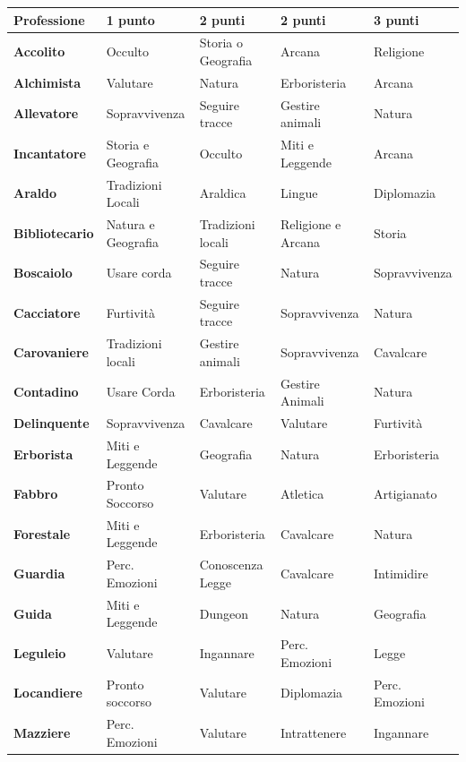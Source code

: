 	\noindent\begin{tabularx}{\linewidth}{X|l|l|l|l}
	\toprule
\rowcolor{gray!20}\textbf{Professione}& \textbf{1 punto} & \textbf{2 punti} & \textbf{2 punti} & \textbf{3 punti}\\
\toprule
\textbf{Accolito}& Occulto& Storia o Geografia& Arcana& Religione\\
\rowcolor{gray!20}\textbf{Alchimista}& Valutare&Natura& Erboristeria& Arcana\\
\textbf{Allevatore}& Sopravvivenza&Seguire tracce& Gestire animali&Natura \\
\rowcolor{gray!20}\textbf{Incantatore}& Storia e Geografia&Occulto&Miti e Leggende&Arcana\\
\textbf{Araldo} & Tradizioni Locali & Araldica & Lingue & Diplomazia \\
\rowcolor{gray!20}\textbf{Bibliotecario}& Natura e Geografia&Tradizioni locali&Religione e Arcana&Storia\\
\textbf{Boscaiolo}& Usare corda&Seguire tracce & Natura& Sopravvivenza\\
\rowcolor{gray!20}\textbf{Cacciatore}& Furtività&Seguire tracce&Sopravvivenza& Natura\\
\textbf{Carovaniere}&Tradizioni locali &Gestire animali&Sopravvivenza&Cavalcare\\
\rowcolor{gray!20}\textbf{Contadino} & Usare Corda & Erboristeria & Gestire Animali& Natura\\
\textbf{Delinquente}& Sopravvivenza&Cavalcare&Valutare&Furtività\\
\rowcolor{gray!20}\textbf{Erborista}& Miti e Leggende&Geografia&Natura&Erboristeria\\
\textbf{Fabbro} & Pronto Soccorso & Valutare&Atletica & Artigianato \\
\rowcolor{gray!20}\textbf{Forestale}& Miti e Leggende&Erboristeria&Cavalcare & Natura\\
\textbf{Guardia}& Perc. Emozioni&Conoscenza Legge&Cavalcare&Intimidire\\
\rowcolor{gray!20}\textbf{Guida}& Miti e Leggende&Dungeon&Natura&Geografia\\
\textbf{Leguleio}& Valutare&Ingannare&Perc. Emozioni&Legge\\
\rowcolor{gray!20}\textbf{Locandiere}& Pronto soccorso&Valutare&Diplomazia&Perc. Emozioni\\
\textbf{Mazziere}& Perc. Emozioni&Valutare&Intrattenere&Ingannare\\

\end{tabularx}
